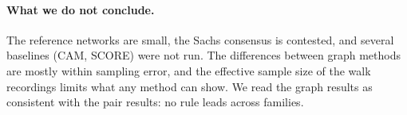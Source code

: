 \paragraph{What we do not conclude.} The reference networks are small, the Sachs consensus is contested, and several baselines (CAM, SCORE) were not run. The differences between graph methods are mostly within sampling error, and the effective sample size of the walk recordings limits what any method can show. We read the graph results as consistent with the pair results: no rule leads across families.
